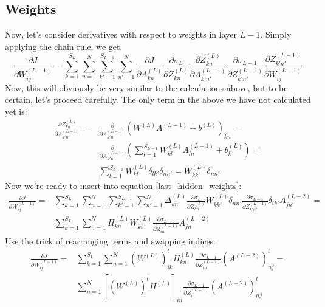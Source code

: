 \documentclass[12pt, a4paper]{article}
\numberwithin{equation}{section}
\begin{document}
\subsection{Weights}
Now, let's consider derivatives with respect to weights in layer $L-1$. Simply applying the chain rule, we get:
\begin{equation}
\label{last_hidden_weights}
\frac{\partial J}{\partial W^{(L-1)}_{ij}}=\sum_{k=1}^{S_L}\sum_{n=1}^N\sum_{k'=1}^{S_{L-1}}\sum_{n'=1}^N\frac{\partial J}{\partial A^{(L)}_{kn}}\frac{\partial\sigma_L}{\partial Z^{(L)}_{kn}}\frac{\partial Z^{(L)}_{kn}}{\partial A^{(L-1)}_{k'n'}}\frac{\partial\sigma_{L-1}}{\partial Z^{(L-1)}_{k'n'}}\frac{\partial Z^{(L-1)}_{k'n'}}{\partial W^{(L-1)}_{ij}}
\end{equation}
Now, this will obviously be very similar to the calculations above, but to be certain, let's proceed carefully. The only term in the above we have not calculated yet is:
\begin{align}
\frac{\partial Z^{(L)}_{kn}}{\partial A^{(L-1)}_{k'n'}}=&\frac{\partial}{\partial A^{(L-1)}_{k'n'}}\left(W^{(L)}A^{(L-1)}+b^{(L)}\right)_{kn}=\\
&\frac{\partial}{\partial A^{(L-1)}_{k'n'}}\left(\sum_{l=1}^{S_{L-1}}W^{(L)}_{kl}A^{(L-1)}_{ln}+b^{(L)}_k\right)=\\
&\sum_{l=1}^{S_{L-1}}W^{(L)}_{kl}\delta_{lk'}\delta_{nn'}=W^{(L)}_{kk'}\delta_{nn'}
\end{align}
Now we're ready to insert into equation \ref{last_hidden_weights}:
\begin{align}
\frac{\partial J}{\partial W^{(L-1)}_{ij}}=&\sum_{k=1}^{S_L}\sum_{n=1}^N\sum_{k'=1}^{S_{L-1}}\sum_{n'=1}^N\Delta^{(L)}_{kn}\frac{\partial\sigma_L}{\partial Z^{(L)}_{kn}}W^{(L)}_{kk'}\delta_{nn'}\frac{\partial\sigma_{L-1}}{\partial Z^{(L-1)}_{k'n'}}\delta_{ik'}A^{(L-2)}_{jn'}=\\
&\sum_{k=1}^{S_L}\sum_{n=1}^N H^{(L)}_{kn}W^{(L)}_{ki}\frac{\partial\sigma_{L-1}}{\partial Z^{(L-1)}_{in}}A^{(L-2)}_{jn}
\end{align}
Use the trick of rearranging terms and swapping indices:
\begin{align}
\frac{\partial J}{\partial W^{(L-1)}_{ij}}=&\sum_{k=1}^{S_L}\sum_{n=1}^N\left(W^{(L)}\right)^t_{ik}H^{(L)}_{kn}\frac{\partial\sigma_{L-1}}{\partial Z^{(L-1)}_{in}}\left(A^{(L-2)}\right)^t_{nj}=\\
&\sum_{n=1}^N\left[\left(W^{(L)}\right)^t H^{(L)}\right]_{in}\frac{\partial\sigma_{L-1}}{\partial Z^{(L-1)}_{in}}\left(A^{(L-2)}\right)^t_{nj}
\end{align}
\end{document}
